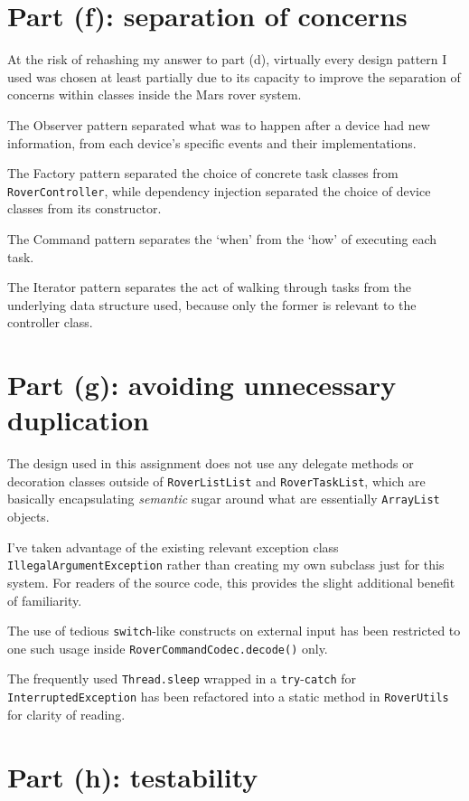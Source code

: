 \documentclass[a4paper,titlepage,12pt]{article}
\begin{document}
\section{Part (f): separation of concerns}

At the risk of rehashing my answer to part (d), virtually every design
pattern I used was chosen at least partially due to its capacity to
improve the separation of concerns within classes inside the Mars rover
system.

The Observer pattern separated what was to happen after a device had
new information, from each device's specific events and their
implementations.

The Factory pattern separated the choice of concrete task classes from
\texttt{RoverController}, while dependency injection separated the
choice of device classes from its constructor.

The Command pattern separates the `when' from the `how' of executing
each task. 

The Iterator pattern separates the act of walking through tasks from
the underlying data structure used, because only the former is relevant
to the controller class.

\section{Part (g): avoiding unnecessary duplication}

The design used in this assignment does not use any delegate methods or
decoration classes outside of \texttt{RoverListList} and
\texttt{RoverTaskList}, which are basically encapsulating
\textit{semantic} sugar around what are essentially \texttt{ArrayList}
objects.

I've taken advantage of the existing relevant exception class
\texttt{IllegalArgumentException} rather than creating my own subclass
just for this system. For readers of the source code, this provides the
slight additional benefit of familiarity.

The use of tedious \texttt{switch}-like constructs on external input
has been restricted to one such usage inside
\texttt{RoverCommandCodec.decode()} only.

The frequently used \texttt{Thread.sleep} wrapped in a
\texttt{try}-\texttt{catch} for \texttt{InterruptedException} has
been refactored into a static method in \texttt{RoverUtils} for
clarity of reading.

\section{Part (h): testability}
\end{document}
